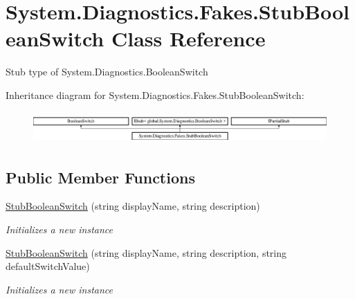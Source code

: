 \hypertarget{class_system_1_1_diagnostics_1_1_fakes_1_1_stub_boolean_switch}{\section{System.\-Diagnostics.\-Fakes.\-Stub\-Boolean\-Switch Class Reference}
\label{class_system_1_1_diagnostics_1_1_fakes_1_1_stub_boolean_switch}
}


Stub type of System.\-Diagnostics.\-Boolean\-Switch 


Inheritance diagram for System.\-Diagnostics.\-Fakes.\-Stub\-Boolean\-Switch\-:\begin{figure}[H]
\begin{center}
\leavevmode
\includegraphics[height=1.220044cm]{class_system_1_1_diagnostics_1_1_fakes_1_1_stub_boolean_switch}
\end{center}
\end{figure}
\subsection*{Public Member Functions}
\begin{DoxyCompactItemize}
\item 
\hyperlink{class_system_1_1_diagnostics_1_1_fakes_1_1_stub_boolean_switch_a096a52743ac12ae02b2da317c20e7769}{Stub\-Boolean\-Switch} (string display\-Name, string description)
\begin{DoxyCompactList}\small\item\em Initializes a new instance\end{DoxyCompactList}\item 
\hyperlink{class_system_1_1_diagnostics_1_1_fakes_1_1_stub_boolean_switch_a786825c135b4324f39af5acee5bef0dc}{Stub\-Boolean\-Switch} (string display\-Name, string description, string default\-Switch\-Value)
\begin{DoxyCompactList}\small\item\em Initializes a new instance\end{DoxyCompactList}\end{DoxyCompactItemize}

